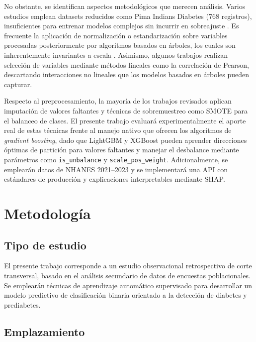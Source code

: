 \documentclass[12pt, a4paper]{report}
\begin{document}
No obstante, se identifican aspectos metodológicos que merecen análisis. Varios estudios emplean datasets reducidos como Pima Indians Diabetes (768 registros), insuficientes para entrenar modelos complejos sin incurrir en sobreajuste \citep{jena2021novel, talari2022hybrid}. Es frecuente la aplicación de normalización o estandarización sobre variables procesadas posteriormente por algoritmos basados en árboles, los cuales son inherentemente invariantes a escala \citep{shao2024optimization, li2024diabetes}. Asimismo, algunos trabajos realizan selección de variables mediante métodos lineales como la correlación de Pearson, descartando interacciones no lineales que los modelos basados en árboles pueden capturar.

Respecto al preprocesamiento, la mayoría de los trabajos revisados aplican imputación de valores faltantes y técnicas de sobremuestreo como SMOTE para el balanceo de clases. El presente trabajo evaluará experimentalmente el aporte real de estas técnicas frente al manejo nativo que ofrecen los algoritmos de \textit{gradient boosting}, dado que LightGBM y XGBoost pueden aprender direcciones óptimas de partición para valores faltantes y manejar el desbalance mediante parámetros como \texttt{is\_unbalance} y \texttt{scale\_pos\_weight}. Adicionalmente, se emplearán datos de NHANES 2021--2023 y se implementará una API con estándares de producción y explicaciones interpretables mediante SHAP.





\chapter{Metodología}

\section{Tipo de estudio}

El presente trabajo corresponde a un estudio observacional retrospectivo de corte transversal, basado en el análisis secundario de datos de encuestas poblacionales. Se emplearán técnicas de aprendizaje automático supervisado para desarrollar un modelo predictivo de clasificación binaria orientado a la detección de diabetes y prediabetes.

\section{Emplazamiento}
\end{document}
